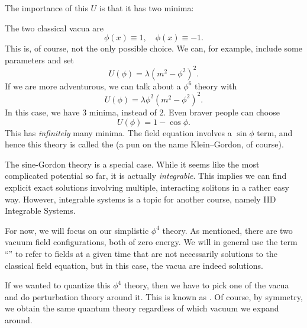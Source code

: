 \documentclass[a4paper]{article}
\begin{document}
The importance of this $U$ is that it has two minima:
\begin{center}
\end{center}
The two classical vacua are
\[
  \phi(x) \equiv 1,\quad \phi(x) \equiv -1.
\]
This is, of course, not the only possible choice. We can, for example, include some parameters and set
\[
  U(\phi) = \lambda(m^2 - \phi^2)^2.
\]
If we are more adventurous, we can talk about a $\phi^6$ theory with
\[
  U(\phi) = \lambda \phi^2 (m^2 - \phi^2)^2.
\]
In this case, we have $3$ minima, instead of $2$. Even braver people can choose
\[
  U(\phi) = 1 - \cos \phi.
\]
This has \emph{infinitely} many minima. The field equation involves a $\sin \phi$ term, and hence this theory is called the  (a pun on the name Klein--Gordon, of course).

The sine-Gordon theory is a special case. While it seems like the most complicated potential so far, it is actually \emph{integrable}. This implies we can find explicit exact solutions involving multiple, interacting solitons in a rather easy way. However, integrable systems is a topic for another course, namely IID Integrable Systems.

For now, we will focus on our simplistic $\phi^4$ theory. As mentioned, there are two vacuum field configurations, both of zero energy. We will in general use the term ``'' to refer to fields at a given time that are not necessarily solutions to the classical field equation, but in this case, the vacua are indeed solutions.

If we wanted to quantize this $\phi^4$ theory, then we have to pick one of the vacua and do perturbation theory around it. This is known as . Of course, by symmetry, we obtain the same quantum theory regardless of which vacuum we expand around.
\end{document}
